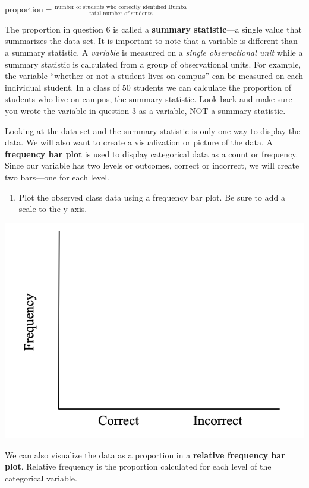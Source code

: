\documentclass[
]{report}
\providecommand{\tightlist}{%
  \setlength{\itemsep}{0pt}\setlength{\parskip}{0pt}}
\begin{document}
\begin{center}
$\mbox{proportion} = \frac{\mbox{number of students who correctly identified Bumba}}{\mbox{total number of students}}$
\end{center}

\vspace{0.7in}

The proportion in question 6 is called a \textbf{summary statistic}---a single value that summarizes the data set. It is important to note that a variable is different than a summary statistic. A \emph{variable} is measured on a \emph{single observational unit} while a summary statistic is calculated from a group of observational units. For example, the variable ``whether or not a student lives on campus'' can be measured on each individual student. In a class of 50 students we can calculate the proportion of students who live on campus, the summary statistic. Look back and make sure you wrote the variable in question 3 as a variable, NOT a summary statistic.

Looking at the data set and the summary statistic is only one way to display the data. We will also want to create a visualization or picture of the data. A \textbf{frequency bar plot} is used to display categorical data as a count or frequency. Since our variable has two levels or outcomes, correct or incorrect, we will create two bars---one for each level.

\begin{enumerate}
\def\labelenumi{\arabic{enumi}.}
\setcounter{enumi}{6}
\tightlist
\item
  Plot the observed class data using a frequency bar plot. Be sure to add a scale to the y-axis.
\end{enumerate}

\begin{center}\includegraphics[width=0.4\linewidth]{images/barplot_martian} \end{center}

We can also visualize the data as a proportion in a \textbf{relative frequency bar plot}. Relative frequency is the proportion calculated for each level of the categorical variable.
\end{document}
